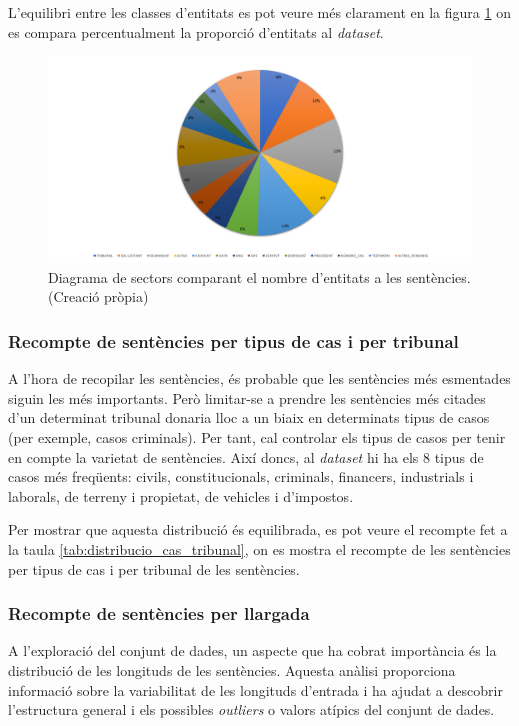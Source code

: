 L'equilibri entre les classes d'entitats es pot veure més clarament en la figura \ref{fig:diagrama_sectors_tipus_entitats} on es compara percentualment la proporció d'entitats al \textit{dataset}.
\begin{figure}[H]
  \centering
  \includegraphics[width=\textwidth]{formatge_tipus_entitats.png}
  \caption[Diagrama de sectors del nombre d'entitats a les sentències]{Diagrama de sectors comparant el nombre d'entitats a les sentències. \\ (Creació pròpia)}
  \label{fig:diagrama_sectors_tipus_entitats}
\end{figure}

\subsubsection{Recompte de sentències per tipus de cas i per tribunal}
A l'hora de recopilar les sentències, és probable que les sentències més esmentades siguin les més importants. Però limitar-se a prendre les sentències més citades d'un determinat tribunal donaria lloc a un biaix en determinats tipus de casos (per exemple, casos criminals). Per tant, cal controlar els tipus de casos per tenir en compte la varietat de sentències. Així doncs, al \textit{dataset} hi ha els 8 tipus de casos més freqüents: civils, constitucionals, criminals, financers, industrials i laborals, de terreny i propietat, de vehicles i d'impostos.

Per mostrar que aquesta distribució és equilibrada, es pot veure el recompte fet a la taula \ref{tab:distribucio_cas_tribunal}, on es mostra el recompte de les sentències per tipus de cas i per tribunal de les sentències.


\subsubsection{Recompte de sentències per llargada}
A l'exploració del conjunt de dades, un aspecte que ha cobrat importància és la distribució de les longituds de les sentències. Aquesta anàlisi proporciona informació sobre la variabilitat de les longituds d'entrada i ha ajudat a descobrir l'estructura general i els possibles \textit{outliers} o valors atípics del conjunt de dades.

